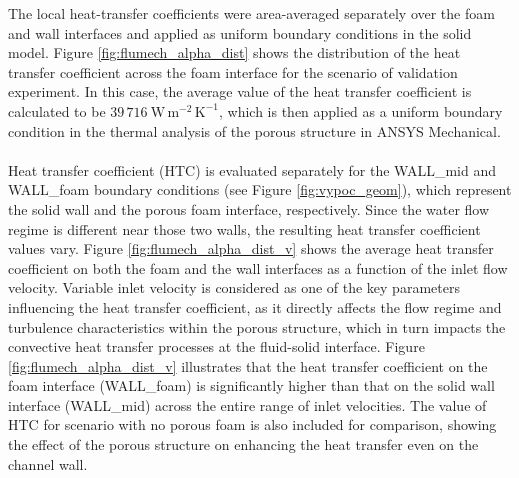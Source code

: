 \documentclass[a4paper]{article}
\begin{document}
The local heat-transfer coefficients were area-averaged separately over the foam and wall interfaces and applied as uniform boundary conditions in the solid model.
Figure \ref{fig:flumech_alpha_dist} shows the distribution of the heat transfer coefficient across the foam interface for the scenario of validation experiment.
In this case, the average value of the heat transfer coefficient is calculated to be $39\,716~\mathrm{W\,m^{-2}\,K^{-1}}$, which is then applied as a uniform boundary condition in the thermal analysis of the porous structure in ANSYS Mechanical.
\\
\\
Heat transfer coefficient (HTC) is evaluated separately for the WALL\_mid and WALL\_foam boundary conditions (see Figure \ref{fig:vypoc_geom}), which represent the solid wall and the porous foam interface, respectively.
Since the water flow regime is different near those two walls, the resulting heat transfer coefficient values vary.
Figure \ref{fig:flumech_alpha_dist_v} shows the average heat transfer coefficient on both the foam and the wall interfaces as a function of the inlet flow velocity.
Variable inlet velocity is considered as one of the key parameters influencing the heat transfer coefficient, as it directly affects the flow regime and turbulence characteristics within the porous structure, which in turn impacts the convective heat transfer processes at the fluid-solid interface.
Figure \ref{fig:flumech_alpha_dist_v} illustrates that the heat transfer coefficient on the foam interface (WALL\_foam) is significantly higher than that on the solid wall interface (WALL\_mid) across the entire range of inlet velocities.
The value of HTC for scenario with no porous foam is also included for comparison, showing the effect of the porous structure on enhancing the heat transfer even on the channel wall.
\end{document}
